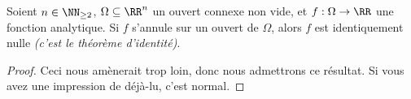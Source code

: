 \begin{fact} \label{multi-analytic-nullity}
    Soient $n \in \NN_{\geq 2}$,
    $\Omega \subseteq \RR^n$ un ouvert connexe non vide,
    et
    $f: \Omega \rightarrow \RR$ une fonction analytique.
	Si $f$ s'annule sur un ouvert de $\Omega$,
	alors $f$ est identiquement nulle
	\emph{(c'est le théorème d'identité)}. 
\end{fact}


\begin{proof}
	Ceci nous amènerait trop loin, donc nous admettrons ce résultat. Si vous avez une impression de déjà-lu, c'est normal.
\end{proof}
